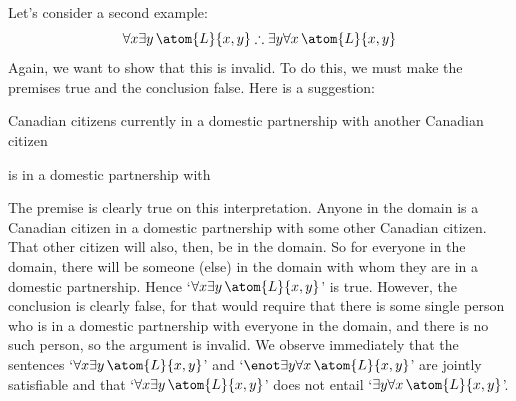 Let's consider a second example:
$$\forall x \exists y\, \atom{L}{x,y} \therefore \exists y \forall x\, \atom{L}{x,y}$$
Again, we want to show that this is invalid. To do this, we must make the premises true and the conclusion false. Here is a suggestion:
\begin{ekey}
	\item[\text{domain}] Canadian citizens currently in a domestic partnership with another Canadian citizen
	\item[\atom{L}{x,y}]  is in a domestic partnership with 
\end{ekey}
The premise is clearly true on this interpretation. Anyone in the domain is a Canadian citizen in a domestic partnership with some other Canadian citizen. That other citizen will also, then, be in the domain. So for everyone in the domain, there will be someone (else) in the domain with whom they are in a domestic partnership. Hence `$\forall x \exists y\, \atom{L}{x,y}$' is true. However, the conclusion is clearly false, for that would require that there is some single person who is in a domestic partnership with everyone in the domain, and there is no such person, so the argument is invalid. We observe immediately that the sentences `$\forall x \exists y\, \atom{L}{x,y}$' and `$\enot\exists y \forall x\, \atom{L}{x,y}$' are jointly satisfiable and that `$\forall x \exists y\, \atom{L}{x,y}$' does not entail `$\exists y \forall x\, \atom{L}{x,y}$'.

